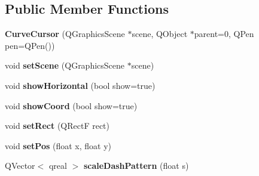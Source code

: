 \subsection*{\-Public \-Member \-Functions}
\begin{DoxyCompactItemize}
\item 
\hypertarget{class_curve_cursor_a65862649ff20f0408eba5d154136ed22}{
{\bfseries \-Curve\-Cursor} (\-Q\-Graphics\-Scene $\ast$scene, \-Q\-Object $\ast$parent=0, \-Q\-Pen pen=\-Q\-Pen())}
\label{class_curve_cursor_a65862649ff20f0408eba5d154136ed22}

\item 
\hypertarget{class_curve_cursor_a9c5852a1d2ce04d6b2f1d25234cc8496}{
void {\bfseries set\-Scene} (\-Q\-Graphics\-Scene $\ast$scene)}
\label{class_curve_cursor_a9c5852a1d2ce04d6b2f1d25234cc8496}

\item 
\hypertarget{class_curve_cursor_a5a807262a47083a458f391bb85695a30}{
void {\bfseries show\-Horizontal} (bool show=true)}
\label{class_curve_cursor_a5a807262a47083a458f391bb85695a30}

\item 
\hypertarget{class_curve_cursor_a05ebb6d293ffdf2757071926de26cc0c}{
void {\bfseries show\-Coord} (bool show=true)}
\label{class_curve_cursor_a05ebb6d293ffdf2757071926de26cc0c}

\item 
\hypertarget{class_curve_cursor_a46f73c029fb255ebb650114da66ede0e}{
void {\bfseries set\-Rect} (\-Q\-Rect\-F rect)}
\label{class_curve_cursor_a46f73c029fb255ebb650114da66ede0e}

\item 
\hypertarget{class_curve_cursor_aed2803cfed05f6cf5384cd11aa01248b}{
void {\bfseries set\-Pos} (float x, float y)}
\label{class_curve_cursor_aed2803cfed05f6cf5384cd11aa01248b}

\item 
\hypertarget{class_curve_cursor_aeb41bbd4578d581cea1ef37078e0d80a}{
\-Q\-Vector$<$ qreal $>$ {\bfseries scale\-Dash\-Pattern} (float s)}
\label{class_curve_cursor_aeb41bbd4578d581cea1ef37078e0d80a}

\end{DoxyCompactItemize}
